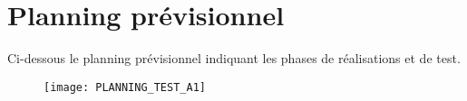 
\section{Planning prévisionnel}
\label{sec:planning}


Ci-dessous le planning prévisionnel indiquant les phases de réalisations et de test.\\

\begin{figure} [H]
    \centering
    \texttt{[image: PLANNING\_TEST\_A1]}
    \label{Planning prévisionnel}
\end{figure}



